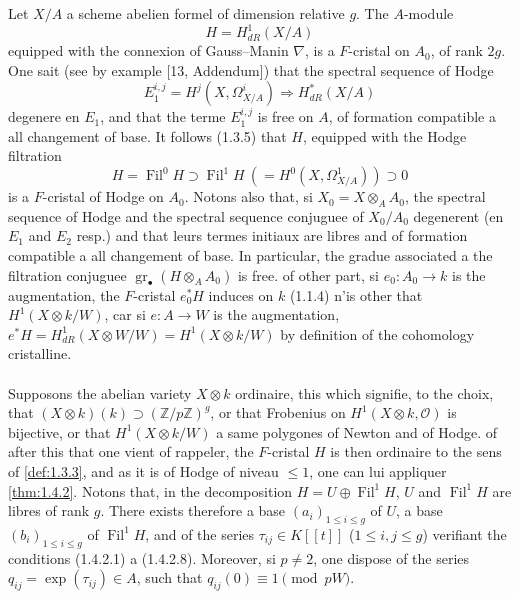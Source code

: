 \documentclass[12pt,a4paper]{article}
\theoremstyle{plain}
\theoremstyle{definition}
\theoremstyle{remark}
\DeclareMathOperator{\gr}{gr}
\DeclareMathOperator{\Fil}{Fil}
\begin{document}
Let $X/A$ a scheme abelien formel of dimension relative $g$. The $A$-module
\[
H = H_{dR}^1(X/A)
\]
equipped with the connexion of Gauss--Manin $\nabla$, is a $F$-cristal on $A_0$, of rank $2g$. One sait (see by example [13, Addendum]) that the spectral sequence of Hodge
\[
E_1^{i,j} = H^j(X, \Omega_{X/A}^i) \Longrightarrow H_{dR}^*(X/A)
\]
degenere en $E_1$, and that the terme $E_1^{i,j}$ is free on $A$, of formation compatible a all changement of base. It follows (1.3.5) that $H$, equipped with the Hodge filtration
\[
H = \Fil^0H \supset \Fil^1H\ (= H^0(X, \Omega_{X/A}^1)) \supset 0
\]
is a $F$-cristal of Hodge on $A_0$. Notons also that, si $X_0 = X \otimes_A A_0$, the spectral sequence of Hodge and the spectral sequence conjuguee of $X_0/A_0$ degenerent (en $E_1$ and $E_2$ resp.) and that leurs termes initiaux are libres and of formation compatible a all changement of base. In particular, the gradue associated a the filtration conjuguee $\gr_\bullet(H \otimes_A A_0)$ is free. of other part, si $e_0 : A_0 \to k$ is the augmentation, the $F$-cristal $e_0^*H$ induces on $k$ (1.1.4) n'is other that $H^1(X \otimes k/W)$, car si $e : A \to W$ is the augmentation, $e^*H = H_{dR}^1(X \otimes W/W) = H^1(X \otimes k/W)$ by definition of the cohomology cristalline.

\paragraph{}

Supposons the abelian variety $X \otimes k$ ordinaire, this which signifie, to the choix, that $(X \otimes k)(k) \supset (\mathbb{Z}/p\mathbb{Z})^g$, or that Frobenius on $H^1(X \otimes k, \mathcal{O})$ is bijective, or that $H^1(X \otimes k/W)$ a same polygones of Newton and of Hodge. of after this that one vient of rappeler, the $F$-cristal $H$ is then ordinaire to the sens of \ref{def:1.3.3}, and as it is of Hodge of niveau $\leq 1$, one can lui appliquer \ref{thm:1.4.2}. Notons that, in the decomposition $H = U \oplus \Fil^1H$, $U$ and $\Fil^1H$ are libres of rank $g$. There exists therefore a base $(a_i)_{1 \leq i \leq g}$ of $U$, a base $(b_i)_{1 \leq i \leq g}$ of $\Fil^1H$, and of the series $\tau_{ij} \in K[[t]]$ ($1 \leq i,j \leq g$) verifiant the conditions (1.4.2.1) a (1.4.2.8). Moreover, si $p \neq 2$, one dispose of the series $q_{ij} = \exp(\tau_{ij}) \in A$, such that $q_{ij}(0) \equiv 1 \pmod{pW}$.

\paragraph{}
\end{document}
